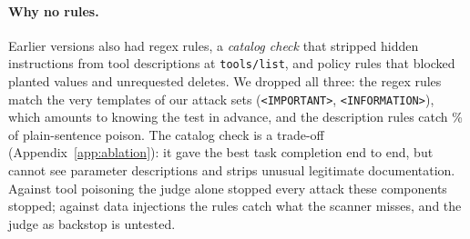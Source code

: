 \paragraph{Why no rules.} Earlier versions also had regex rules, a \emph{catalog check} that
stripped hidden instructions from tool descriptions at \texttt{tools/list}, and policy rules
that blocked planted values and unrequested deletes. We dropped all three: the regex rules
match the very templates of our attack sets (\texttt{<IMPORTANT>}, \texttt{<INFORMATION>}),
which amounts to knowing the test in advance, and the description rules catch
\CatalogRulesPlainCaught\% of plain-sentence poison. The catalog check is a trade-off
(Appendix~\ref{app:ablation}): it gave the best task completion end to end, but cannot see
parameter descriptions and strips unusual legitimate documentation. Against tool poisoning
the judge alone stopped every attack these components stopped; against data injections the
rules catch what the \dthree scanner misses, and the judge as backstop is untested.
